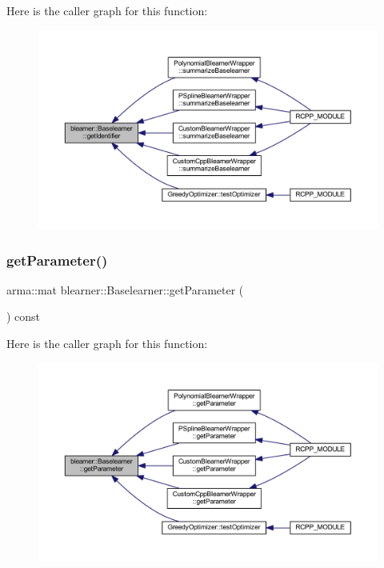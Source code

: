 Here is the caller graph for this function\+:
\nopagebreak
\begin{figure}[H]
\begin{center}
\leavevmode
\includegraphics[width=350pt]{classblearner_1_1_baselearner_aa10fa4301aeb37f6e8c18457541c3be7_icgraph}
\end{center}
\end{figure}
\mbox{\label{classblearner_1_1_baselearner_a3362fe72e1b653ec3664cae2397414ed}} 
\subsubsection{\texorpdfstring{get\+Parameter()}{getParameter()}}
{\footnotesize\ttfamily arma\+::mat blearner\+::\+Baselearner\+::get\+Parameter (\begin{DoxyParamCaption}{ }\end{DoxyParamCaption}) const}

Here is the caller graph for this function\+:
\nopagebreak
\begin{figure}[H]
\begin{center}
\leavevmode
\includegraphics[width=350pt]{classblearner_1_1_baselearner_a3362fe72e1b653ec3664cae2397414ed_icgraph}
\end{center}
\end{figure}
\mbox{\label{classblearner_1_1_baselearner_af01f1b8c4540927705ff79c3649489f7}} 

